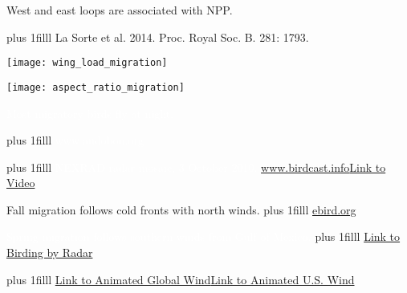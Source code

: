 \documentclass[t]{beamer}
\newcommand\imagecredit[1]{%
	\vskip0pt plus 1filll \tiny #1}%
\begin{document}
{
\begin{frame}[t,plain]{West and east loops are associated with NPP.}

	\imagecredit{\hfill La Sorte et al. 2014. Proc. Royal Soc. B. 281: 1793.}
\end{frame}
}

\begin{frame}
\texttt{[image: wing\_load\_migration]}
\end{frame}

\begin{frame}
\texttt{[image: aspect\_ratio\_migration]} \end{frame}

{
\begin{frame}[t,plain]{\textcolor{white}{Most migratory birds fly at night.}}

	\imagecredit{\textcolor{white}{www.audobon.org}}
\end{frame}
}

{
\begin{frame}[t,plain]

	\imagecredit{\textcolor{white}{NEXRAD radar mosaic, 3 October 2010. \url{www.birdcast.info}\hfill\href{https://www.youtube.com/watch?v=uPff1t4pXiI}{Link to Video}}}
\end{frame}
}


{
\begin{frame}[t,plain]{Fall migration follows cold fronts with north winds.}
	\imagecredit{\hfill\url{ebird.org}}
\end{frame}
}


{
\begin{frame}[t,plain]{\textcolor{white}{Spring migration follows southern winds from Gulf of Mexico.}}
	\imagecredit{\hfill\textcolor{white}{\href{https://people.mbi.ohio-state.edu/hurtado.10/US_Composite_Radar/}{Link to Birding by Radar}}}
\end{frame}
}

{
\begin{frame}[t,plain]{}
	\imagecredit{\href{http://earth.nullschool.net}{Link to Animated Global Wind}\hfill\href{http://hint.fm/wind/}{Link to Animated U.S. Wind}}
\end{frame}
}
\end{document}
